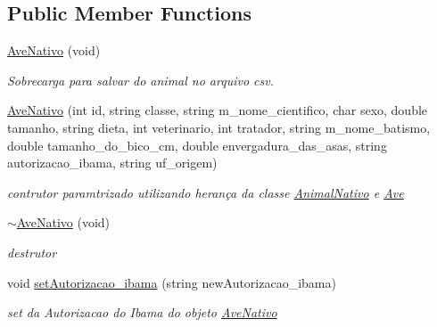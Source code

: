 \subsection*{Public Member Functions}
\begin{DoxyCompactItemize}
\item 
\mbox{\label{class_ave_nativo_a325f9de4be8b9f42bceb1f0bad1dd72f}} 
\mbox{\hyperlink{class_ave_nativo_a325f9de4be8b9f42bceb1f0bad1dd72f}{Ave\+Nativo}} (void)
\begin{DoxyCompactList}\small\item\em Sobrecarga para salvar do animal no arquivo csv. \end{DoxyCompactList}\item 
\mbox{\label{class_ave_nativo_a8b4749060ed81faac358da93edbae34e}} 
\mbox{\hyperlink{class_ave_nativo_a8b4749060ed81faac358da93edbae34e}{Ave\+Nativo}} (int id, string classe, string m\+\_\+nome\+\_\+cientifico, char sexo, double tamanho, string dieta, int veterinario, int tratador, string m\+\_\+nome\+\_\+batismo, double tamanho\+\_\+do\+\_\+bico\+\_\+cm, double envergadura\+\_\+das\+\_\+asas, string autorizacao\+\_\+ibama, string uf\+\_\+origem)
\begin{DoxyCompactList}\small\item\em contrutor paramtrizado utilizando herança da classe \mbox{\hyperlink{class_animal_nativo}{Animal\+Nativo}} e \mbox{\hyperlink{class_ave}{Ave}} \end{DoxyCompactList}\item 
\mbox{\label{class_ave_nativo_a3e3fb1d7f7e96c75e5e73809df6460ae}} 
\mbox{\hyperlink{class_ave_nativo_a3e3fb1d7f7e96c75e5e73809df6460ae}{$\sim$\+Ave\+Nativo}} (void)
\begin{DoxyCompactList}\small\item\em destrutor \end{DoxyCompactList}\item 
void \mbox{\hyperlink{class_ave_nativo_a6c1f962eece15f55777561729a5b7fa5}{set\+Autorizacao\+\_\+ibama}} (string new\+Autorizacao\+\_\+ibama)
\begin{DoxyCompactList}\small\item\em set da Autorizacao do Ibama do objeto \mbox{\hyperlink{class_ave_nativo}{Ave\+Nativo}} \end{DoxyCompactList}\item 

\end{DoxyCompactItemize}
